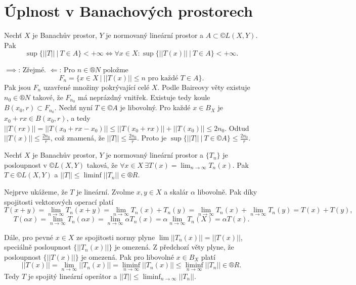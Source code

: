 \documentclass[12pt]{article}					%
\begin{document}
\section{Úplnost v Banachových prostorech}
\begin{veta}
	Nechť $X$ je Banachův prostor, $Y$ je normovaný lineární prostor a $A \subset ©L(X, Y)$. Pak
	$$ \sup\{||T||\ |\ T \in A\} < +∞ \Leftrightarrow \forall x \in X: \sup\{||T(x)||\ |\ T \in A\} < +∞. $$

	\begin{dukazin}[Ze skript]
		$\implies$: Zřejmé. $\Leftarrow$: Pro $n \in ®N$ položme
		$$ F_n = \{x \in X\ |\ ||T(x)|| ≤ n \text{ pro každé } T \in A\}. $$
		Pak jsou $F_n$ uzavřené množiny pokrývající celé $X$. Podle Baireovy věty existuje $n_0 \in ®N$ takové, že $F_{n_0}$ má neprázdný vnitřek. Existuje tedy koule $B(x_0, r) \subset F_{n_0}$. Nechť nyní $T \in ©A$ je libovolný. Pro každé $x \in B_X$ je $x_0 + r x \in B(x_0, r)$, a tedy $||T(r x)|| = ||T(x_0 + r x - x_0)|| ≤ ||T(x_0 + r x)|| + ||T(x_0)|| ≤ 2n_0$. Odtud $||T(x)|| ≤ \frac{2n_0}{r}$, což znamená, že $||T|| ≤ \frac{2n_0}{r}$. Proto je $\sup\{||T||\ |\ T \in ©A\} ≤ \frac{2n_0}{r}$.
	\end{dukazin}
\end{veta}

\begin{dusledek}
	Nechť $X$ je Banachův prostor, $Y$ je normovaný lineární prostor a $\{T_n\}$ je posloupnost v $©L(X, Y)$ taková, že $\forall x \in X\ \exists T(x) = \lim_{n \rightarrow ∞} T_n(x)$. Pak $T \in ©L(X, Y)$ a $||T|| ≤ \liminf ||T_n|| \in ®R$.

	\begin{dukazin}[Ze skript]
		Nejprve ukážeme, že $T$ je lineární. Zvolme $x, y \in X$ a skalár $\alpha$ libovolně. Pak díky spojitosti vektorových operací platí
		$$ T(x + y) = \lim_{n \rightarrow ∞} T_n(x + y) = \lim_{n \rightarrow ∞} T_n(x) + T_n(y) = \lim_{n \rightarrow ∞} T_n(x) + \lim_{n \rightarrow ∞} T_n(y) = T(x) + T(y), $$
		$$ T(\alpha x) = \lim_{n \rightarrow ∞} T_n(\alpha x) = \lim_{n \rightarrow ∞} \alpha T_n(x) = \alpha \lim_{n \rightarrow ∞} T_n(X) = \alpha T(x). $$
		
		Dále, pro pevné $x \in X$ ze spojitosti normy plyne $\lim||T_n(x)|| = ||T(x)||$, speciálně posloupnost $\{||T_n(x)||\}$ je omezená. Z předchozí věty plyne, že posloupnost $\{||T(x)||\}$ je omezená. Pak pro libovolné $x \in B_X$ platí
		$$ ||T(x)|| = \lim_{n \rightarrow ∞} ||T_n(x)|| = \liminf_{n \rightarrow ∞} ||T_n(x)|| ≤ \liminf_{n \rightarrow ∞}||T_n|| \in ®R. $$
		Tedy $T$ je spojitý lineární operátor a $||T|| ≤ \liminf_{n \rightarrow ∞} ||T_n||$.
	\end{dukazin}
\end{dusledek}
\end{document}
